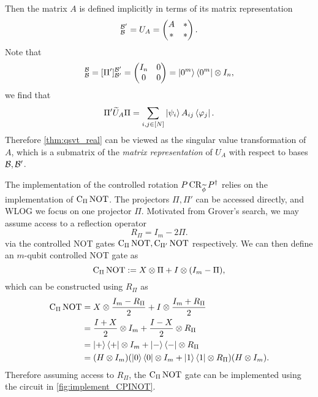 Then the matrix $A$ is defined implicitly in terms of its matrix representation
\begin{equation}
[\wt{U}_A]_{\mc{B}}^{\mc{B}'}=U_A=\begin{pmatrix}
A & * \\
* & *
\end{pmatrix}.
\label{eqn:qsvt_proj_blockencode}
\end{equation}
Note that 
\begin{equation}
[\Pi]_{\mc{B}}^{\mc{B}}=[\Pi']_{\mc{B'}}^{\mc{B'}}=\begin{pmatrix}
I_n & 0 \\
0 & 0
\end{pmatrix}=\ket{0^m}\bra{0^m}\otimes I_n,
\end{equation}
we find that 
\begin{equation}
\Pi'\widetilde{U}_A\Pi=\sum_{i,j\in [N]}\ket{\psi_i} A_{ij}\bra{\varphi_j}.
\end{equation}
Therefore \cref{thm:qsvt_real} can be viewed as the singular value transformation of $A$, which is a submatrix of the \emph{matrix representation} of $U_A$ with respect to bases $\mathcal{B},\mathcal{B}'$. 

The implementation of the controlled rotation $P\operatorname{CR}_{\widetilde{\phi}}P^{\dag}$ relies on the implementation of $\operatorname{C}_{\Pi}\operatorname{NOT}$.
The projectors $\Pi,\Pi'$ can be accessed directly, and WLOG we focus on one projector $\Pi$. 
Motivated from Grover's search, we may assume access to a reflection operator
\begin{equation}
R_{\Pi}=I_m-2\Pi.
\end{equation}
via the controlled NOT gates $\operatorname{C}_{\Pi}\operatorname{NOT},\operatorname{C}_{\Pi'}\operatorname{NOT}$ respectively. We can then define an $m$-qubit controlled NOT gate as
\begin{equation}
\operatorname{C}_{\Pi}\operatorname{NOT}:=X\otimes \Pi+I\otimes (I_{m}-\Pi),
\end{equation}
which can be constructed using $R_{\Pi}$ as
\begin{equation}
\begin{split}
\operatorname{C}_{\Pi}\operatorname{NOT}&=X\otimes \frac{I_m-R_{\Pi}}{2}+I\otimes \frac{I_m+R_{\Pi}}{2}\\
&=\frac{I+X}{2} \otimes I_m + \frac{I-X}{2} \otimes R_{\Pi}\\
&=\ket{+}\bra{+}\otimes I_m+\ket{-}\bra{-}\otimes R_\Pi\\
&=(H\otimes I_m)(\ket{0}\bra{0}\otimes I_m+\ket{1}\bra{1}\otimes R_\Pi)(H\otimes I_m).
\end{split}
\label{eqn:reflection_cpinot}
\end{equation}
Therefore assuming access to $R_{\Pi}$, the $\operatorname{C}_{\Pi}\operatorname{NOT}$ gate can be implemented using the circuit in \cref{fig:implement_CPINOT}.

